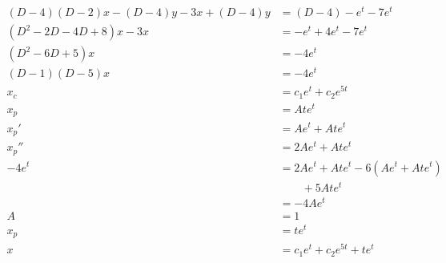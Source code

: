 \documentclass{article}
\begin{document}
\begin{align*}
  (D - 4) (D - 2) x - (D - 4) y - 3 x + (D - 4) y & = (D - 4) -e^t - 7 e^t                    \\
  (D^2 - 2 D - 4 D + 8) x - 3 x                   & = -e^t + 4 e^t - 7 e^t                    \\
  (D^2 - 6 D + 5) x                               & = -4 e^t                                  \\
  (D - 1) (D - 5) x                               & = -4 e^t                                  \\
  x_c                                             & = c_1 e^t + c_2 e^{5 t}                   \\
  x_p                                             & = A t e^t                                 \\
  x_p'                                            & = A e^t + A t e^t                         \\
  x_p''                                           & = 2 A e^t + A t e^t                       \\
  -4 e^t                                          & = 2 A e^t + A t e^t - 6 (A e^t + A t e^t) \\
                                                  & \qquad + 5 A t e^t                        \\
                                                  & = -4 A e^t                                \\
  A                                               & = 1                                       \\
  x_p                                             & = t e^t                                   \\
  x                                               & = c_1 e^t + c_2 e^{5 t} + t e^t
\end{align*}

\end{document}
